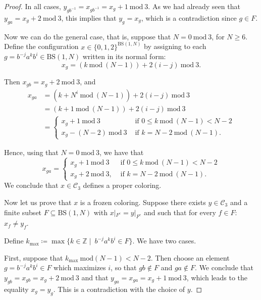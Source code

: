 \documentclass[letterpaper,11pt,reqno]{amsart}
\theoremstyle{plain}
\theoremstyle{definition}
\theoremstyle{cupremark}
\newcommand{\BS}[1][N]{\mathrm{BS}(1,#1)}
\begin{document}
\begin{proof}
	In all cases, $y_{gb^{-1}}=x_{gb^{-1}}=x_{g}+1\ \mathrm{mod} \ 3$. As we had already seen that $y_{ga}=x_{g}+2\ \mathrm{mod}\ 3$, this implies that $y_g=x_g$, which is a contradiction since $g\in F$.
	
	
	
	Now we can do the general case, that is, suppose that $N=0 \ \mathrm{mod} \ 3$, for $N \ge 6$. Define the configuration $x\in \{0,1,2\}^{\BS}$ by assigning to each $g=b^{-j}a^kb^{i}\in \BS$ written in its normal form:
	$$
	x_g=(k\ \mathrm{mod}\ (N-1))+ 2(i-j)\ \mathrm{mod}\  3.
	$$ 
	
	Then $x_{gb}=x_g+2 \ \mathrm{mod} \ 3$, and
	\begin{align*}
	x_{ga}&=(k+N^i \ \mathrm{mod}\ (N-1))+2(i-j)\ \mathrm{mod}\ 3\\
	&=(k+1 \ \mathrm{mod}\ (N-1))+2(i-j)\ \mathrm{mod}\ 3\\
	&=\left\{
	\begin{aligned}
	x_g+1 \ \mathrm{mod}\ 3 &\text{ if } 0\le k\ \mathrm{mod}\ (N-1) <N-2\\
	x_g-(N-2) \ \mathrm{mod}\ 3 &\text{ if }  k=N-2 \ \mathrm{mod}\ (N-1).
	\end{aligned}
	\right.
	\end{align*}	
	
	Hence, using that $N=0\ \mathrm{mod}\ 3$, we have that
	$$
	x_{ga}=\begin{cases}
	x_g+1 \ \mathrm{mod} \ 3&\text{ if } 0\le k\ \mathrm{mod}\ (N-1) <N-2\\
	x_{g}+2 \ \mathrm{mod} \ 3, &\text{ if }k=N-2 \ \mathrm{mod}\ (N-1).
	\end{cases}
	$$	
	We conclude that $x\in \mathcal{C}_3$ defines a proper coloring.
	
	Now let us prove that $x$ is a frozen coloring. Suppose there exists $y\in \mathcal{C}_3$ and a finite subset $F\subseteq\BS$ with $x|_{F^{c}}=y|_{F^c}$ and such that for every $f\in F$: $x_f\neq y_f$.
	
	Define $k_{\mathrm{max}}\coloneqq \max\{k\in \mathbb{Z}\mid \ b^{-j}a^kb^i\in F \}$. We have two cases.
	
	First, suppose that $k_{\mathrm{max}} \ \mathrm{mod} (N-1)<N-2$. Then choose an element $g=b^{-j}a^kb^i\in F$ which maximizes $i$, so that $gb\notin F$ and $ga\notin F$. We conclude that $y_{gb}=x_{gb}=x_g+2\ \mathrm{mod}\ 3$ and that $y_{ga}=x_{ga}=x_g+1\ \mathrm{mod}\ 3$, which leads to the  equality $x_g=y_g$. This is a contradiction with the choice of $y$.
	

\end{proof}
\end{document}
